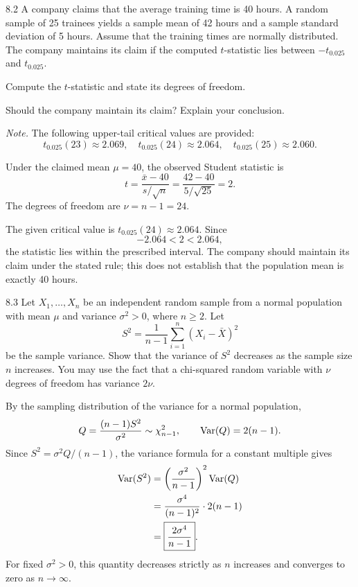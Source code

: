 \documentclass[11pt,oneside]{article}
\begin{document}
\begin{problem}{8.2}
A company claims that the average training time is 40 hours. A random sample of 25 trainees yields a sample mean of 42 hours and a sample standard deviation of 5 hours. Assume that the training times are normally distributed. The company maintains its claim if the computed $t$-statistic lies between $-t_{0.025}$ and $t_{0.025}$.
\begin{problemsubparts}
\item Compute the $t$-statistic and state its degrees of freedom.
\item Should the company maintain its claim? Explain your conclusion.
\end{problemsubparts}
\textit{Note.} The following upper-tail critical values are provided:
\[
t_{0.025}(23)\approx2.069,\quad
 t_{0.025}(24)\approx2.064,\quad
 t_{0.025}(25)\approx2.060.
\]
\end{problem}

\begin{solution}
\begin{problemsubparts}
\item Under the claimed mean $\mu=40$, the observed Student statistic is
\[
 t=\frac{\bar x-40}{s/\sqrt n}
 =\frac{42-40}{5/\sqrt{25}}=\boxed{2}.
\]
The degrees of freedom are $\boxed{\nu=n-1=24}$.
\item The given critical value is $t_{0.025}(24)\approx2.064$. Since
\[
 -2.064<2<2.064,
\]
the statistic lies within the prescribed interval. The company should maintain its claim under the stated rule; this does not establish that the population mean is exactly 40 hours.
\end{problemsubparts}
\end{solution}

\begin{problem}{8.3}
Let $X_1,\ldots,X_n$ be an independent random sample from a normal population with mean $\mu$ and variance $\sigma^2>0$, where $n\ge2$. Let
\[
S^2=\frac{1}{n-1}\sum_{i=1}^n(X_i-\bar X)^2
\]
be the sample variance. Show that the variance of $S^2$ decreases as the sample size $n$ increases. You may use the fact that a chi-squared random variable with $\nu$ degrees of freedom has variance $2\nu$.
\end{problem}

\begin{solution}
By the sampling distribution of the variance for a normal population,
\[
Q=\frac{(n-1)S^2}{\sigma^2}\sim\chi^2_{n-1},
\qquad \operatorname{Var}(Q)=2(n-1).
\]
Since $S^2=\sigma^2Q/(n-1)$, the variance formula for a constant multiple gives
\[
\begin{aligned}
\operatorname{Var}(S^2)
&=\left(\frac{\sigma^2}{n-1}\right)^2\operatorname{Var}(Q)\\
&=\frac{\sigma^4}{(n-1)^2}\cdot2(n-1)\\
&=\boxed{\frac{2\sigma^4}{n-1}}.
\end{aligned}
\]
For fixed $\sigma^2>0$, this quantity decreases strictly as $n$ increases and converges to zero as $n\to\infty$.
\end{solution}
\end{document}
